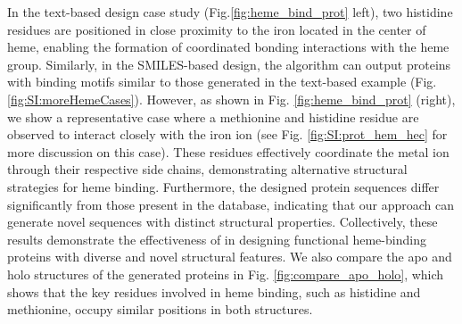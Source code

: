 In the text-based design case study (Fig.\ref{fig:heme_bind_prot} left), two histidine residues are positioned in close proximity to the iron located in the center of heme, enabling the formation of coordinated bonding interactions with the heme group. Similarly, in the SMILES-based design, the algorithm can output proteins with binding motifs similar to those generated in the text-based example (Fig. \ref{fig:SI:moreHemeCases}). However, as shown in Fig. \ref{fig:heme_bind_prot} (right), we show a representative case where a methionine and histidine residue are observed to interact closely with the iron ion (see Fig. \ref{fig:SI:prot_hem_hec} for more discussion on this case). These residues effectively coordinate the metal ion through their respective side chains, demonstrating alternative structural strategies for heme binding. Furthermore, the designed protein sequences differ significantly from those present in the database, indicating that our approach can generate novel sequences with distinct structural properties. Collectively, these results demonstrate the effectiveness of \ourM{} in designing functional heme-binding proteins with diverse and novel structural features. We also compare the apo and holo structures of the generated proteins in Fig. \ref{fig:compare_apo_holo}, which shows that the key residues involved in heme binding, such as histidine and methionine, occupy similar positions in both structures.










